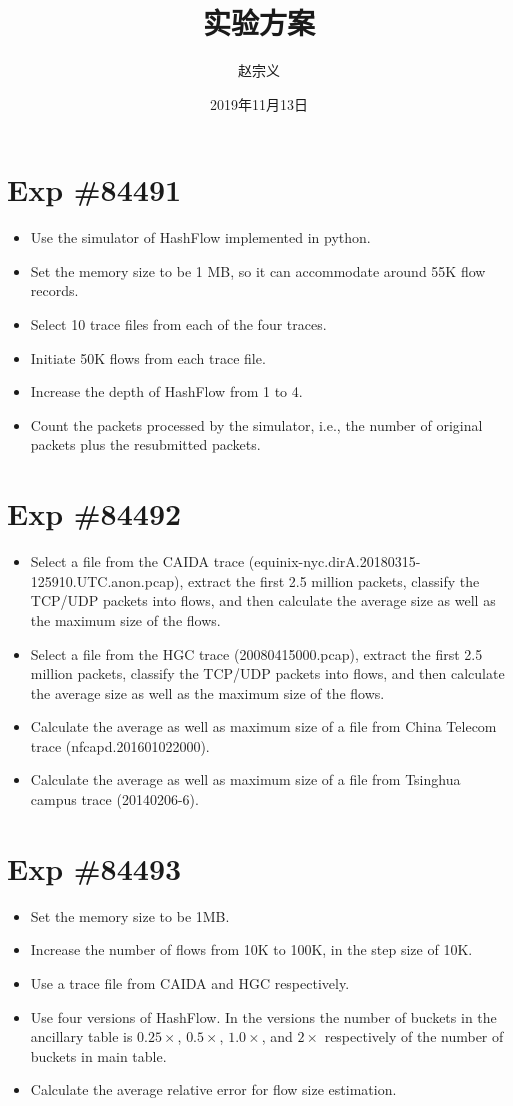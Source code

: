 \documentclass{article}
\title{实验方案}
\author{赵宗义}
\date{2019年11月13日}
\begin{document}
\maketitle
\section*{Exp \#84491}
\begin{itemize}
	\item Use the simulator of HashFlow implemented in python.
	\item Set the memory size to be 1 MB, so it can accommodate around 55K flow records.
	\item Select 10 trace files from each of the four traces.
	\item Initiate 50K flows from each trace file.
	\item Increase the depth of HashFlow from 1 to 4. 
	\item Count the packets processed by the simulator, i.e., the number of original packets plus the resubmitted packets.
\end{itemize}

\section*{Exp \#84492}
\begin{itemize}
	\item Select a file from the CAIDA trace (equinix-nyc.dirA.20180315-125910.UTC.anon.pcap), extract the first 2.5 million packets, classify the TCP/UDP packets into flows, and then calculate the average size as well as the maximum size of the flows.
	\item Select a file from the HGC trace (20080415000.pcap), extract the first 2.5 million packets, classify the TCP/UDP packets into flows, and then calculate the average size as well as the maximum size of the flows.
	\item Calculate the average as well as maximum size of a file from China Telecom trace (nfcapd.201601022000).
	\item Calculate the average as well as maximum size of a file from Tsinghua campus trace (20140206-6). 
\end{itemize}

\section*{Exp \#84493}
\begin{itemize}
	\item Set the memory size to be 1MB. 
	\item Increase the number of flows from 10K to 100K, in the step size of 10K.
	\item Use a trace file from CAIDA and HGC respectively.
	\item Use four versions of HashFlow. In the versions the number of buckets in the ancillary table is $0.25\times$, $0.5\times$, $1.0\times$, and $2\times$ respectively of the number of buckets in main table.
	\item Calculate the average relative error for flow size estimation.
\end{itemize}
\end{document}

